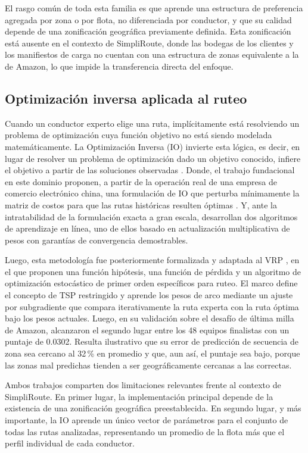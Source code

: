El rasgo común de toda esta familia es que aprende una estructura de preferencia agregada por zona o por flota, no diferenciada por conductor, y que su calidad depende de una zonificación geográfica previamente definida. Esta zonificación está ausente en el contexto de SimpliRoute, donde las bodegas de los clientes y los manifiestos de carga no cuentan con una estructura de zonas equivalente a la de Amazon, lo que impide la transferencia directa del enfoque.

\subsection{Optimización inversa aplicada al ruteo}

Cuando un conductor experto elige una ruta, implícitamente está resolviendo un problema de optimización cuya función objetivo no está siendo modelada matemáticamente. La Optimización Inversa (IO) invierte esta lógica, es decir, en lugar de resolver un problema de optimización dado un objetivo conocido, infiere el objetivo a partir de las soluciones observadas \cite{ahuja2001inverse}. Donde, el trabajo fundacional en este dominio proponen, a partir de la operación real de una empresa de comercio electrónico china, una formulación de IO que perturba mínimamente la matriz de costos para que las rutas históricas resulten óptimas \cite{chen2021inverse}. Y, ante la intratabilidad de la formulación exacta a gran escala, desarrollan dos algoritmos de aprendizaje en línea, uno de ellos basado en actualización multiplicativa de pesos con garantías de convergencia demostrables.

Luego, esta metodología fue posteriormente formalizada y adaptada al VRP \cite{zattoni2025inverse}, en el que proponen una función hipótesis, una función de pérdida y un algoritmo de optimización estocástico de primer orden específicos para ruteo. El marco define el concepto de TSP restringido y aprende los pesos de arco mediante un ajuste por subgradiente que compara iterativamente la ruta experta con la ruta óptima bajo los pesos actuales. Luego, en su validación sobre el desafío de última milla de Amazon, alcanzaron el segundo lugar entre los 48 equipos finalistas con un puntaje de 0.0302. Resulta ilustrativo que su error de predicción de secuencia de zona sea cercano al 32\,\% en promedio y que, aun así, el puntaje sea bajo, porque las zonas mal predichas tienden a ser geográficamente cercanas a las correctas.

Ambos trabajos comparten dos limitaciones relevantes frente al contexto de SimpliRoute. En primer lugar, la implementación principal depende de la existencia de una zonificación geográfica preestablecida. En segundo lugar, y más importante, la IO aprende un único vector de parámetros para el conjunto de todas las rutas analizadas, representando un promedio de la flota más que el perfil individual de cada conductor.

